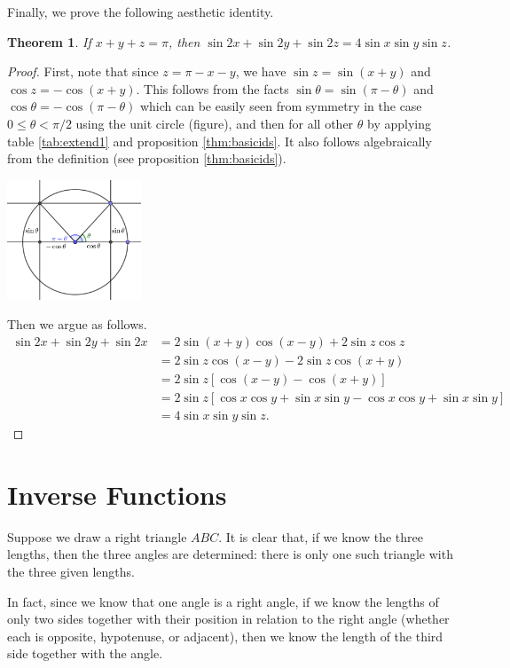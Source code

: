 \documentclass[a4paper,leqno]{article}
\numberwithin{equation}{section}
\newtheorem{thm}[equation]{Theorem}
\theoremstyle{definition}
\theoremstyle{remark}
\begin{document}
Finally, we prove the following aesthetic identity.
\begin{thm}
  If $ x + y + z = \pi $, then $ \sin 2x + \sin 2y + \sin 2z = 4\sin x \sin y \sin z $.
\end{thm}
\begin{proof}
  First, note that since $ z = \pi - x - y $, we have $ \sin z = \sin(x + y) $ and $ \cos z = -\cos(x + y) $. This follows
  from the facts $ \sin \theta = \sin(\pi - \theta) $ and $ \cos \theta = -\cos(\pi - \theta) $ which can be easily seen
  from symmetry in the case $ 0 \leq \theta < \pi/2 $ using the unit circle (figure), and then for all other $ \theta $ by
  applying table \ref{tab:extend1} and proposition \ref{thm:basicids}. It also follows algebraically from the definition
  (see proposition \ref{thm:basicids}).
  \begin{center}
    \includegraphics[width=0.3\textwidth]{piminus}
  \end{center}
  Then we argue as follows.
  \begin{align*}
    \sin 2x + \sin 2y + \sin 2x &= 2\sin(x + y)\cos(x - y) + 2\sin z \cos z\\
                                &= 2\sin z \cos(x - y) - 2\sin z \cos(x + y)\\
                                &= 2\sin z [\cos(x - y) - \cos(x + y)]\\
                                &= 2\sin z [\cos x \cos y + \sin x \sin y - \cos x \cos y + \sin x \sin y]\\
                                &= 4\sin x \sin y \sin z.
  \end{align*}
\end{proof}

\section{Inverse Functions}
Suppose we draw a right triangle $ ABC $. It is clear that, if we know the three lengths, then the three angles are determined: there
is only one such triangle with the three given lengths.

In fact, since we know that one angle is a right angle, if we know the lengths of only two sides together with their position in relation
to the right angle (whether each is opposite, hypotenuse, or adjacent), then we know the length of the third side together with the angle.
\end{document}
